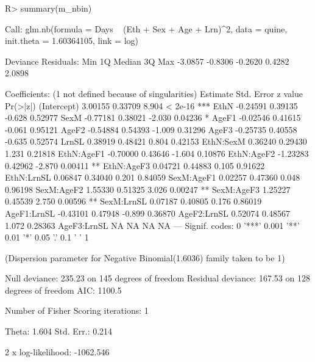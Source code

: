 \documentclass[article]{jss}
\begin{document}
\begin{CodeChunk}
  \begin{CodeInput}
    R> summary(m_nbin)
  \end{CodeInput}
  \begin{CodeOutput}
    Call:
    glm.nb(formula = Days ~ (Eth + Sex + Age + Lrn)^2, data = quine,
    init.theta = 1.60364105, link = log)

    Deviance Residuals:
    Min       1Q   Median       3Q      Max
    -3.0857  -0.8306  -0.2620   0.4282   2.0898

    Coefficients: (1 not defined because of singularities)
    Estimate Std. Error z value Pr(>|z|)
    (Intercept)  3.00155    0.33709   8.904  < 2e-16 ***
    EthN        -0.24591    0.39135  -0.628  0.52977
    SexM        -0.77181    0.38021  -2.030  0.04236 *
    AgeF1       -0.02546    0.41615  -0.061  0.95121
    AgeF2       -0.54884    0.54393  -1.009  0.31296
    AgeF3       -0.25735    0.40558  -0.635  0.52574
    LrnSL        0.38919    0.48421   0.804  0.42153
    EthN:SexM    0.36240    0.29430   1.231  0.21818
    EthN:AgeF1  -0.70000    0.43646  -1.604  0.10876
    EthN:AgeF2  -1.23283    0.42962  -2.870  0.00411 **
    EthN:AgeF3   0.04721    0.44883   0.105  0.91622
    EthN:LrnSL   0.06847    0.34040   0.201  0.84059
    SexM:AgeF1   0.02257    0.47360   0.048  0.96198
    SexM:AgeF2   1.55330    0.51325   3.026  0.00247 **
    SexM:AgeF3   1.25227    0.45539   2.750  0.00596 **
    SexM:LrnSL   0.07187    0.40805   0.176  0.86019
    AgeF1:LrnSL -0.43101    0.47948  -0.899  0.36870
    AgeF2:LrnSL  0.52074    0.48567   1.072  0.28363
    AgeF3:LrnSL       NA         NA      NA       NA
    ---
    Signif. codes:  0 '***' 0.001 '**' 0.01 '*' 0.05 '.' 0.1 ' ' 1

    (Dispersion parameter for Negative Binomial(1.6036) family taken to be 1)

    Null deviance: 235.23  on 145  degrees of freedom
    Residual deviance: 167.53  on 128  degrees of freedom
    AIC: 1100.5

    Number of Fisher Scoring iterations: 1


    Theta:  1.604
    Std. Err.:  0.214

    2 x log-likelihood:  -1062.546
  \end{CodeOutput}
\end{CodeChunk}



\end{document}
